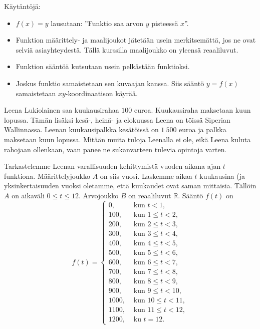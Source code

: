
Käytäntöjä:
\begin{itemize}
\item $f(x) = y$ lausutaan: ''Funktio saa arvon $y$ pisteessä $x$''.
\item Funktion määrittely- ja maalijoukot jätetään usein merkitsemättä, jos ne ovat selviä asiayhteydestä. Tällä kurssilla maalijoukko on yleensä reaaliluvut.
\item Funktion sääntöä kutsutaan usein pelkästään funktioksi.
\item Joskus funktio samaistetaan sen kuvaajan kanssa.  Siis sääntö $y=f(x)$ samaistetaan $xy$-koordinaatison käyrää.
\end{itemize}

\begin{esimerkki}
Leena Lukiolainen saa kuukausirahaa $100$ euroa.  Kuukausiraha maksetaan kuun lopussa. Tämän lisäksi kesä-, heinä- ja elokuussa Leena on töissä Siperian Wallinnassa.  Leenan kuukausipalkka kesätöissä on $1\ 500$ euroa ja palkka maksetaan kuun lopussa.  Mitään muita tuloja Leenalla ei ole, eikä Leena kuluta rahojaan ollenkaan, vaan panee ne sukanvarteen tulevia opintoja varten. 

Tarkastelemme Leenan varallisuuden kehittymistä vuoden aikana ajan $t$ funktiona. Määrittelyjoukko $A$ on siis vuosi. Laskemme aikaa $t$ kuukausina (ja yksinkertaisuuden vuoksi oletamme, että kuukaudet ovat saman mittaisia. Tällöin $A$ on aikaväli $0\le t\le 12$. Arvojoukko $B$ on reaaliluvut $\mathbb{R}$.  Sääntö $f(t)$ on
$$
f(t) = \left\{\begin{array}{rl}
0, & \text{ kun } t<1, \\
100, & \text{ kun } 1\le t < 2, \\
200, & \text{ kun } 2\le t < 3, \\
300, & \text{ kun } 3\le t < 4, \\
400, & \text{ kun } 4\le t < 5, \\
500, & \text{ kun } 5\le t < 6, \\
600, & \text{ kun } 6\le t < 7, \\
700, & \text{ kun } 7\le t < 8, \\
800, & \text{ kun } 8\le t < 9, \\
900, & \text{ kun } 9\le t < 10, \\
1000, & \text{ kun } 10\le t < 11, \\
1100, & \text{ kun } 11\le t < 12, \\
1200, & \text{ ku } t=12.
\end{array}\right.
$$
\end{esimerkki}

